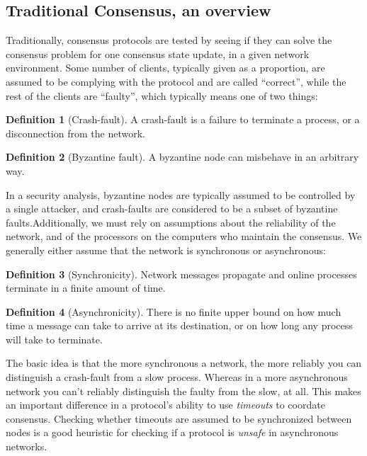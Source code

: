 \documentclass[11pt,a4paper]{article}
\theoremstyle{plain}
\theoremstyle{definition}
\newtheorem{defn}{Definition}
\begin{document}
\subsection{Traditional Consensus, an overview}

Traditionally, consensus protocols are tested by seeing if they can solve the consensus problem for one consensus state update, in a given network environment. Some number of clients, typically given as a proportion, are assumed to be complying with the protocol and are called ``correct'', while the rest of the clients are ``faulty'', which typically means one of two things:

\begin{defn}[Crash-fault]
A crash-fault is a failure to terminate a process, or a disconnection from the network.
\end{defn}

\begin{defn}[Byzantine fault]
A byzantine node can misbehave in an arbitrary way. 
\end{defn}

In a security analysis, byzantine nodes are typically assumed to be controlled by a single attacker, and crash-faults are considered to be a subset of byzantine faults.Additionally, we must rely on assumptions about the reliability of the network, and of the processors on the computers who maintain the consensus. We generally either assume that the network is synchronous or asynchronous: 

\begin{defn}[Synchronicity]
Network messages propagate and online processes terminate in a finite amount of time.
\end{defn}

\begin{defn}[Asynchronicity]
There is no finite upper bound on how much time a message can take to arrive at its destination, or on how long any process will take to terminate. 
\end{defn}

The basic idea is that the more synchronous a network, the more reliably you can distinguish a crash-fault from a slow process. Whereas in a more asynchronous network you can't reliably distinguish the faulty from the slow, at all. This makes an important difference in a protocol's ability to use \emph{timeouts} to coordate consensus. Checking whether timeouts are assumed to be synchronized between nodes is a good heuristic for checking if a protocol is \emph{unsafe} in asynchronous networks. 
\end{document}
